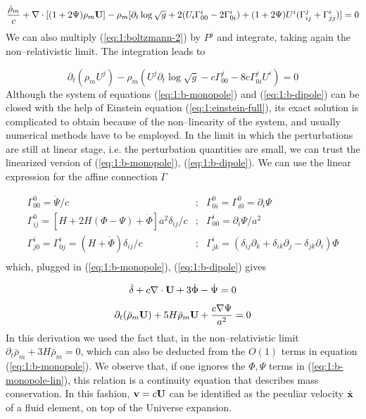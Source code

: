 \begin{equation}
\label{eq:1:b-monopole}
\frac{\dot{\rho}_m}{c} + \nabla\cdot[(1+2\Psi)\rho_m\mathbf{U}] - \rho_m[\partial_t\log \sqrt{g} +  2(U_i\Gamma^i_{00} - 2\Gamma^i_{0i}) + (1+2\Psi)U^i(\Gamma_{ij}^j+\Gamma^i_{jj})] = 0
\end{equation}
%
We can also multiply (\ref{eq:1:boltzmann-2}) by $P^j$ and integrate, taking again the non--relativistic limit. The integration leads to 

\begin{equation}
\label{eq:1:b-dipole}
\partial_t(\rho_m U^j) - \rho_m (U^j\partial_t\log \sqrt{g} - c\Gamma^j_{00} - 8c\Gamma_{0i}^jU^i) = 0 
\end{equation}
%
Although the system of equations (\ref{eq:1:b-monopole}) and (\ref{eq:1:b-dipole}) can be closed with the help of Einstein equation (\ref{eq:1:einstein-full}), its exact solution is complicated to obtain because of the non--linearity of the system, and usually numerical methods have to be employed. In the limit in which the perturbations are still at linear stage, i.e. the perturbation quantities are small, we can trust the linearized version of (\ref{eq:1:b-monopole}), (\ref{eq:1:b-dipole}). We can use the linear expression for the affine connection $\Gamma$

\begin{equation}
\label{eq:1:connection}
\begin{matrix}
\Gamma_{00}^0 = \dot{\Psi}/c & ; & \Gamma_{0i}^0=\Gamma_{i0}^0 = \partial_i\Psi \\  
\Gamma_{ij}^0 = [H+2H(\Phi-\Psi)+\dot{\Phi}]a^2\delta_{ij}/c & ; & \Gamma_{00}^i = \partial_i \Psi/a^2 \\
\Gamma^i_{j0} = \Gamma^i_{0j} = (H+\dot{\Phi})\delta_{ij}/c & ; & \Gamma_{jk}^i = (\delta_{ij}\partial_k+\delta_{ik}\partial_j-\delta_{jk}\partial_i)\Phi\\
\end{matrix}
\end{equation}
%
which, plugged in (\ref{eq:1:b-monopole}), (\ref{eq:1:b-dipole}) gives 

\begin{equation}
\label{eq:1:b-monopole-lin}
\dot{\delta} + c \nabla\cdot \mathbf{U} + 3\dot{\Phi} - \dot{\Psi} = 0
\end{equation}

\begin{equation}
\label{eq:1:b-dipole-lin}
\partial_t(\bar{\rho}_m\mathbf{U}) + 5H\bar{\rho}_m\mathbf{U} + \frac{c\nabla\Psi}{a^2} = 0
\end{equation}
%
In this derivation we used the fact that, in the non--relativistic limit $\partial_t\bar{\rho}_m + 3H\bar{\rho}_m=0$, which can also be deducted from the $O(1)$ terms in equation (\ref{eq:1:b-monopole}). We observe that, if one ignores the $\Phi,\Psi$ terms in (\ref{eq:1:b-monopole-lin}), this relation is a continuity equation that describes mass conservation. In this fashion, $\mathbf{v}=c\mathbf{U}$ can be identified as the peculiar velocity $\dot{\mathbf{x}}$ of a fluid element, on top of the Universe expansion. 

